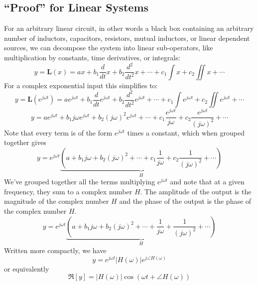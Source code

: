\subsection{``Proof'' for Linear Systems}
 For an arbitrary linear circuit, in other words a black box containing an arbitrary number of inductors, capacitors, resistors, mutual inductors, or linear dependent sources, we can  decompose the system into linear sub-operators, like multiplication by constants, time derivatives, or integrals:
    \begin{equation}
        y = \mathbf{L}(x) = a x + b_1 \frac{d}{dt} x + b_2\frac{d^2}{dt^2} x + \cdots + c_1 \int x + c_2 \iint x + \cdots
    \end{equation}
For a complex exponential input this simplifies to:
    \begin{equation}
        y  = \mathbf{L}(e^{j\omega t}) = a e^{j\omega t} + b_1 \frac{d}{dt} e^{j\omega t} + b_2\frac{d^2}{dt^2} e^{j\omega t} + \cdots + c_1 \int e^{j\omega t} + c_2 \iint e^{j\omega t} + \cdots
    \end{equation}
    \begin{equation}
        y  = a e^{j\omega t} + b_1 j\omega e^{j\omega t} + b_2 ( j\omega)^2 e^{j\omega t} + \cdots + c_1 \frac{e^{j\omega t}}{ j\omega} + c_2 \frac{e^{j\omega t}}{ (j\omega)^2} + \cdots
    \end{equation}
Note that every term is of the form $e^{j\omega t}$ times a constant, which when grouped together gives
    \begin{equation}
        y =  e^{j\omega t} \underbrace{\left(a  + b_1 j\omega  + b_2 ( j\omega)^2 + \cdots + c_1 \frac{1}{ j\omega} + c_2 \frac{1}{ (j\omega)^2}  + \cdots \right)}_{H}
    \end{equation}
We've grouped together all the terms multiplying $e^{j\omega t}$ and note that at a given frequency, they sum to a complex number $H$.    The amplitude of the output is the magnitude of the complex number $H$ and the phase of the output is the phase of the complex number $H$.
    \begin{equation}
        y =  e^{j\omega t} \underbrace{\left(a  + b_1 j\omega + b_2 ( j\omega)^2 + \cdots + \frac{1}{ j\omega} + \frac{1}{ (j\omega)^2}  + \cdots \right)}_{H}
    \end{equation}
Written more compactly, we have
    \begin{equation}
        y = e^{j\omega t} |H(\omega)| e^{j\angle H(\omega)}
    \end{equation}
or equivalently
    \begin{equation}
        \Re[ y ] =  |H(\omega)| \cos ( \omega t + \angle H(\omega))
    \end{equation}
